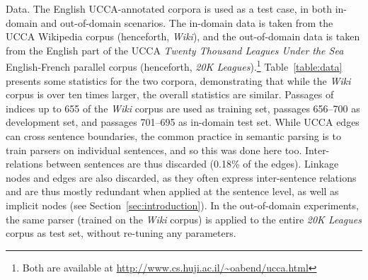 \documentclass[11pt]{article}
\makeatletter
\newcommand{\secref}[1]{Section~\ref{#1}}
\newcommand{\tabref}[1]{Table~\ref{#1}}
\renewcommand{\paragraph}{
  \@startsection{paragraph}{4}
  {\z@}{.3ex \@plus .3ex \@minus .2ex}{-1em}
  {\normalfont\normalsize\bfseries}
}
\makeatother
\begin{document}
\paragraph{Data.}\label{sec:data}
The English UCCA-annotated corpora \cite{abend2013universal} is used
as a test case, in both in-domain and out-of-domain scenarios.
The in-domain data is taken from the UCCA Wikipedia corpus (henceforth, \textit{Wiki}),
and the out-of-domain data is taken from the English part of the UCCA
\textit{Twenty Thousand Leagues Under the Sea} English-French parallel corpus
(henceforth, \textit{20K Leagues}).\footnote{Both are available at
\url{http://www.cs.huji.ac.il/~oabend/ucca.html}}
\tabref{table:data} presents some statistics for the two corpora, demonstrating that while
the \textit{Wiki} corpus is over ten times larger, the overall statistics are
similar.
Passages of indices up to 655 of the \textit{Wiki} corpus are used as training
set, passages 656--700 as development set, and passages 701--695 as in-domain test set.
While UCCA edges can cross sentence boundaries, the common
practice in semantic parsing is to train parsers on individual sentences,
and so this was done here too.
Inter-relations between sentences are thus discarded (0.18\% of the edges).
Linkage nodes and edges are also discarded, as they often express
inter-sentence relations and are thus mostly redundant when applied at the
sentence level, as well as implicit nodes (see \secref{sec:introduction}).
In the out-of-domain experiments, the same parser
(trained on the \textit{Wiki} corpus) is applied to the entire \textit{20K
Leagues} corpus as test set, without re-tuning any parameters.
\end{document}
